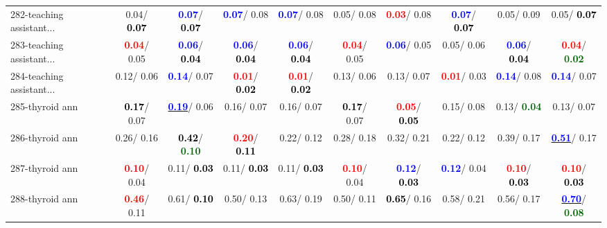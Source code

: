 \begin{table}[h]
\begin{center}
{\begin{tabular}{lc|c|c|c|c|c|c|c|c}
282-teaching assistant... &   0.04/\textcolor{black}{\textbf{  0.07}} & \textcolor{blue}{\textbf{  0.07}}/\textcolor{black}{\textbf{  0.07}} & \textcolor{blue}{\textbf{  0.07}}/  0.08 & \textcolor{blue}{\textbf{  0.07}}/  0.08 &   0.05/  0.08 & \textcolor{red}{\textbf{  0.03}}/  0.08 & \textcolor{blue}{\textbf{  0.07}}/\textcolor{black}{\textbf{  0.07}} &   0.05/  0.09 &   0.05/\textcolor{black}{\textbf{  0.07}} \\
283-teaching assistant... & \textcolor{red}{\textbf{  0.04}}/  0.05 & \textcolor{blue}{\textbf{  0.06}}/\textcolor{black}{\textbf{  0.04}} & \textcolor{blue}{\textbf{  0.06}}/\textcolor{black}{\textbf{  0.04}} & \textcolor{blue}{\textbf{  0.06}}/\textcolor{black}{\textbf{  0.04}} & \textcolor{red}{\textbf{  0.04}}/  0.05 & \textcolor{blue}{\textbf{  0.06}}/  0.05 &   0.05/  0.06 & \textcolor{blue}{\textbf{  0.06}}/\textcolor{black}{\textbf{  0.04}} & \textcolor{red}{\textbf{  0.04}}/\textcolor{darkgreen}{\textbf{  0.02}} \\
284-teaching assistant... &   0.12/  0.06 & \textcolor{blue}{\textbf{  0.14}}/  0.07 & \textcolor{red}{\textbf{  0.01}}/\textcolor{black}{\textbf{  0.02}} & \textcolor{red}{\textbf{  0.01}}/\textcolor{black}{\textbf{  0.02}} &   0.13/  0.06 &   0.13/  0.07 & \textcolor{red}{\textbf{  0.01}}/  0.03 & \textcolor{blue}{\textbf{  0.14}}/  0.08 & \textcolor{blue}{\textbf{  0.14}}/  0.07 \\ \hline
285-thyroid ann & \textcolor{black}{\textbf{  0.17}}/  0.07 & \underline{\textcolor{blue}{\textbf{  0.19}}}/  0.06 &   0.16/  0.07 &   0.16/  0.07 & \textcolor{black}{\textbf{  0.17}}/  0.07 & \textcolor{red}{\textbf{  0.05}}/\textcolor{black}{\textbf{  0.05}} &   0.15/  0.08 &   0.13/\textcolor{darkgreen}{\textbf{  0.04}} &   0.13/  0.07 \\
286-thyroid ann &   0.26/  0.16 & \textcolor{black}{\textbf{  0.42}}/\textcolor{darkgreen}{\textbf{  0.10}} & \textcolor{red}{\textbf{  0.20}}/\textcolor{black}{\textbf{  0.11}} &   0.22/  0.12 &   0.28/  0.18 &   0.32/  0.21 &   0.22/  0.12 &   0.39/  0.17 & \underline{\textcolor{blue}{\textbf{  0.51}}}/  0.17 \\
287-thyroid ann & \textcolor{red}{\textbf{  0.10}}/  0.04 &   0.11/\textcolor{black}{\textbf{  0.03}} &   0.11/\textcolor{black}{\textbf{  0.03}} &   0.11/\textcolor{black}{\textbf{  0.03}} & \textcolor{red}{\textbf{  0.10}}/  0.04 & \textcolor{blue}{\textbf{  0.12}}/\textcolor{black}{\textbf{  0.03}} & \textcolor{blue}{\textbf{  0.12}}/  0.04 & \textcolor{red}{\textbf{  0.10}}/\textcolor{black}{\textbf{  0.03}} & \textcolor{red}{\textbf{  0.10}}/\textcolor{black}{\textbf{  0.03}} \\
288-thyroid ann & \textcolor{red}{\textbf{  0.46}}/  0.11 &   0.61/\textcolor{black}{\textbf{  0.10}} &   0.50/  0.13 &   0.63/  0.19 &   0.50/  0.11 & \textcolor{black}{\textbf{  0.65}}/  0.16 &   0.58/  0.21 &   0.56/  0.17 & \underline{\textcolor{blue}{\textbf{  0.70}}}/\textcolor{darkgreen}{\textbf{  0.08}} \\\end{tabular}}\label{stratsALCKappa8AllReduxhalfa}
\end{center}
\end{table}
